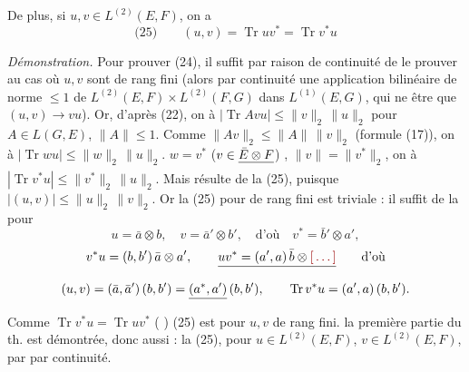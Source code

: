 \documentclass[11pt,a4paper]{article}
\begin{document}
De plus, si $u, v \in L^{(2)}(E,F)$, on a
\[
  \text{(25)}\qquad (u, v) = \operatorname{Tr} uv^{*} = \operatorname{Tr} v^{*}u
\]

\emph{Démonstration.} Pour prouver (24), il suffit par raison de continuité \struck{\ill{}} de le prouver au cas où $u, v$ sont de rang fini (alors    par continuité   une application bilinéaire de norme $\leq 1$ de $L^{(2)}(E,F) \times L^{(2)}(F,G)$ dans $L^{(1)}(E,G)$, qui \ill{}  \struck{\ill{}} ne  être que $(u,v) \to vu$). Or,  d'après (22), on   \ill{} à  $|\operatorname{Tr} Avu| \leq \|v\|_2\, \|u\|_2$ pour $A \in L(G,E)$, $\|A\| \leq 1$. Comme $\|Av\|_2 \leq \|A\|\,\|v\|_2$ \struck{\ill{}} (formule (17)), on   à  $|\operatorname{Tr} wu| \leq \|w\|_2\, \|u\|_2$.   $w = v^{*}$  ($v \in \struck{\bar{E} \otimes F}$) , $\|v\| = \|v^{*}\|_2$, on   à  $|\operatorname{Tr} v^{*}u| \leq \|v^{*}\|_2\, \|u\|_2$. Mais  résulte de la  (25), puisque $|(u,v)| \leq \|u\|_2\, \|v\|_2$.  Or la  (25) pour  de rang fini est triviale : il suffit de la  pour 
\[
  u = \bar{a} \otimes b, \quad v = \bar{a}' \otimes b', \quad \text{d'où}\quad v^{*} = \bar{b}' \otimes a',
\]
\[
  v^{*}u = (b, b')\, \bar{a} \otimes a', \qquad \struck{uv^{*} = (a', a)\, \bar{b} \otimes \ill{}} \qquad \text{d'où}
\]
\[
  (u, v) = (\bar{a}, \bar{a}')\,(b, b') = \struck{(a^{*}, a')}\,(b, b'), \qquad \operatorname{Tr} v^{*}u = (a', a)\,(b, b').
\]
Comme $\operatorname{Tr} v^{*}u = \operatorname{Tr} uv^{*}$ (\struck{\ill{}}  \ill{}   ) (25) est  pour $u, v$ de rang fini.   la première partie du th. est démontrée, donc aussi : la  (25), pour  $u \in L^{(2)}(E,F)$, $v \in L^{(2)}(E,F)$, par  par continuité.
\end{document}
